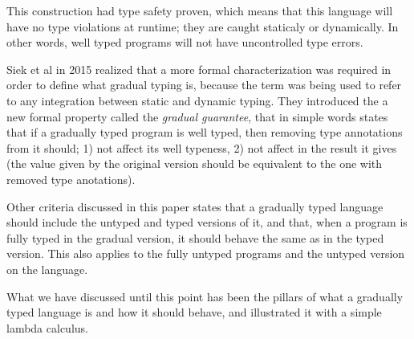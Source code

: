 \documentclass[submission]{eptcs}
\begin{document}
%
%
%

This construction had type safety proven, which means that this language will have no type violations at runtime; they are caught staticaly or dynamically.
In other words, well typed programs will not have uncontrolled type errors.

%

Siek et al in 2015 \cite{siek_et_al:LIPIcs.SNAPL.2015.274} realized that a more formal characterization was required in order to define what gradual typing is, because the term was being used to refer to any integration between static and dynamic typing.
They introduced the a new formal property called the \textit{gradual guarantee}, that in simple words states that if a gradually typed program is well typed, then removing type annotations from it should; 1) not affect its well typeness, 2) not affect in the result it gives (the value given by the original version should be equivalent to the one with removed type anotations).

Other criteria discussed in this paper states that a gradually typed language should include the untyped and typed versions of it, and that, when a program is fully typed in the gradual version, it should behave the same as in the typed version.
This also applies to the fully untyped programs and the untyped version on the language.


What we have discussed until this point has been the pillars of what a gradually typed language is and how it should behave, and illustrated it with a simple lambda calculus.
\end{document}
